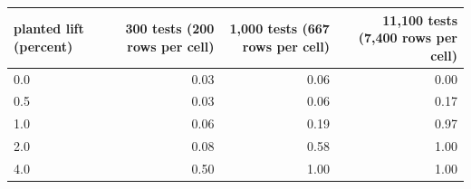 \begin{tabular}{lrrr}
\toprule
planted lift (percent) & 300 tests (200 rows per cell) & 1,000 tests (667 rows per cell) & 11,100 tests (7,400 rows per cell) \\
\midrule
0.0 & 0.03 & 0.06 & 0.00 \\
0.5 & 0.03 & 0.06 & 0.17 \\
1.0 & 0.06 & 0.19 & 0.97 \\
2.0 & 0.08 & 0.58 & 1.00 \\
4.0 & 0.50 & 1.00 & 1.00 \\
\bottomrule
\end{tabular}
